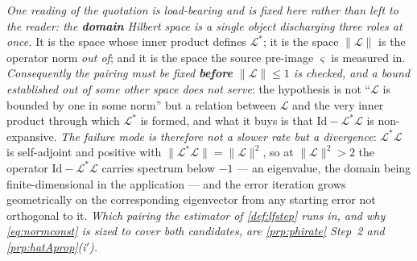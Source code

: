 \begin{remark}
\smallskip
\emph{One reading of the quotation is load-bearing and is fixed here rather than left to the reader: the
\textbf{domain} Hilbert space is a single object discharging three roles at once.} It is the space whose
inner product defines $\mathcal L^{\ast}$; it is the space $\|\mathcal L\|$ is the operator norm
\emph{out of}; and it is the space the source pre-image $\varsigma$ is measured in. \emph{Consequently
the pairing must be fixed \textbf{before} $\|\mathcal L\|\le1$ is checked, and a bound established out
of some other space does not serve}: the hypothesis is not ``$\mathcal L$ is bounded by one in some
norm'' but a relation between $\mathcal L$ and the very inner product through which $\mathcal L^{\ast}$
is formed, and what it buys is that $\mathrm{Id}-\mathcal L^{\ast}\mathcal L$ is non-expansive. \emph{The failure
mode is therefore not a slower rate but a divergence}: $\mathcal L^{\ast}\mathcal L$ is self-adjoint and
positive with $\|\mathcal L^{\ast}\mathcal L\|=\|\mathcal L\|^{2}$, so at $\|\mathcal L\|^{2}>2$ the
operator $\mathrm{Id}-\mathcal L^{\ast}\mathcal L$ carries spectrum below $-1$ --- an eigenvalue, the domain being
finite-dimensional in the application --- and the error iteration grows geometrically on the
corresponding eigenvector from any starting error not orthogonal to it. \emph{Which pairing the
estimator of \cref{def:lfstep} runs in, and why \eqref{eq:normconst} is sized to cover both candidates,
are \cref{prp:phirate} Step~2 and \cref{prp:hatAprop}\textup{(i$'$)}.}


\end{remark}
